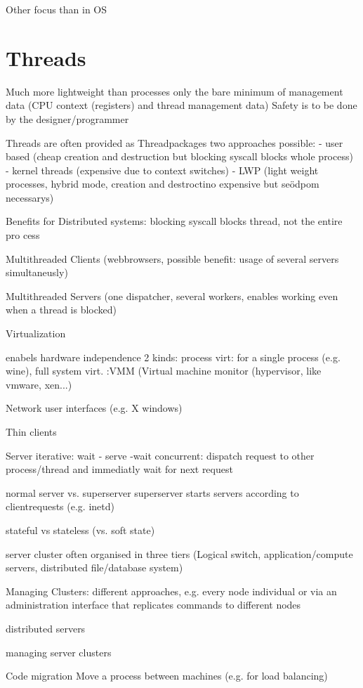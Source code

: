 Other focus than in OS

\section{Threads}
Much more lightweight than processes
only the bare minimum of management data (CPU context (registers) and thread management data)
Safety is to be done by the designer/programmer

Threads are often provided as Threadpackages 
two approaches possible: 
- user based (cheap creation and destruction but blocking syscall blocks whole process)
- kernel threads (expensive due to context switches)
- LWP (light weight processes, hybrid mode, creation and destroctino expensive but seödpom necessarys)

Benefits for Distributed systems: blocking syscall blocks thread, not the entire pro cess

Multithreaded Clients (webbrowsers, possible benefit: usage of several servers simultaneusly)

Multithreaded Servers (one dispatcher, several workers, enables working even when a thread is blocked)

Virtualization

enabels hardware independence
2 kinds: process virt: for a single process (e.g. wine), full system virt. :VMM (Virtual machine monitor (hypervisor, like vmware, xen...)

Network user interfaces (e.g. X windows) 

Thin clients

Server 
iterative: wait - serve -wait
concurrent: dispatch request to other process/thread and immediatly wait for next request


normal server vs. superserver
superserver starts servers according to clientrequests (e.g. inetd)

stateful vs stateless (vs. soft state)

server cluster
often organised in three tiers (Logical switch, application/compute servers, distributed file/database system)

Managing Clusters:
different approaches, e.g. every node individual or via an administration interface that replicates commands to different nodes


distributed servers

managing server clusters

Code migration
Move a process between machines (e.g. for load balancing)
